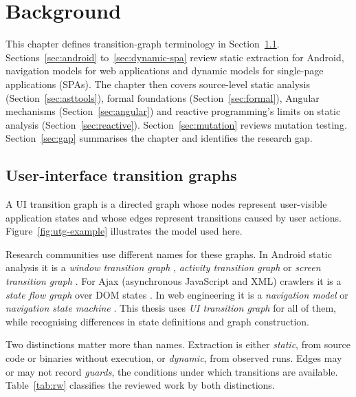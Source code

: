 \section{Background}
\label{ch:background}

This chapter defines transition-graph terminology in Section~\ref{sec:terminology}.
Sections~\ref{sec:android} to~\ref{sec:dynamic-spa} review static extraction for Android,
navigation models for web applications and dynamic models for single-page applications (SPAs).
The chapter then covers source-level static analysis (Section~\ref{sec:asttools}), formal
foundations (Section~\ref{sec:formal}), Angular mechanisms (Section~\ref{sec:angular}) and
reactive programming's limits on static analysis (Section~\ref{sec:reactive}).
Section~\ref{sec:mutation} reviews mutation testing.
Section~\ref{sec:gap} summarises the chapter and identifies the research gap.

\subsection{User-interface transition graphs}
\label{sec:terminology}

A UI transition graph is a directed graph whose nodes represent user-visible application
states and whose edges represent transitions caused by user actions.
Figure~\ref{fig:utg-example} illustrates the model used here.



Research communities use different names for these graphs. In Android static analysis it is a
\emph{window transition graph} \cite{yang2015wtg}, \emph{activity transition graph} \cite{storydroid2019} or \emph{screen transition
graph} \cite{goalexplorer2019}. For Ajax (asynchronous JavaScript and XML) crawlers it is a \emph{state
flow graph} over DOM states \cite{crawljax2012}. In web
engineering it is a \emph{navigation model} or \emph{navigation state
machine} \cite{riccatonella2001,sitehopper2013}. This thesis uses \emph{UI transition graph}
for all of them, while recognising differences in state definitions and graph construction.

Two distinctions matter more than names. Extraction is either \emph{static}, from
source code or binaries without execution, or \emph{dynamic}, from observed runs. Edges
may or may not record \emph{guards}, the conditions under which transitions are available.
Table~\ref{tab:rw} classifies the reviewed work by both distinctions.

